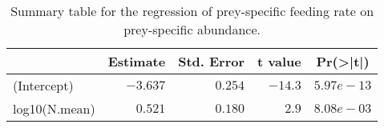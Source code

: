 \begin{table}[!htbp]
\caption{Summary table for the regression of 
  prey-specific feeding rate 
  on prey-specific abundance.\label{tab:FN}} 
\begin{center}
\begin{tabular}{lrrrr}
\hline
\multicolumn{1}{l}{}&\multicolumn{1}{c}{Estimate}&\multicolumn{1}{c}{Std. Error}&\multicolumn{1}{c}{t value}&\multicolumn{1}{c}{Pr(\textgreater |t|)}\tabularnewline
\hline
(Intercept)&$-3.637$&$0.254$&$-14.3$&$5.97e-13$\tabularnewline
log10(N.mean)&$ 0.521$&$0.180$&$  2.9$&$8.08e-03$\tabularnewline
\hline
\end{tabular}\end{center}
\end{table}
